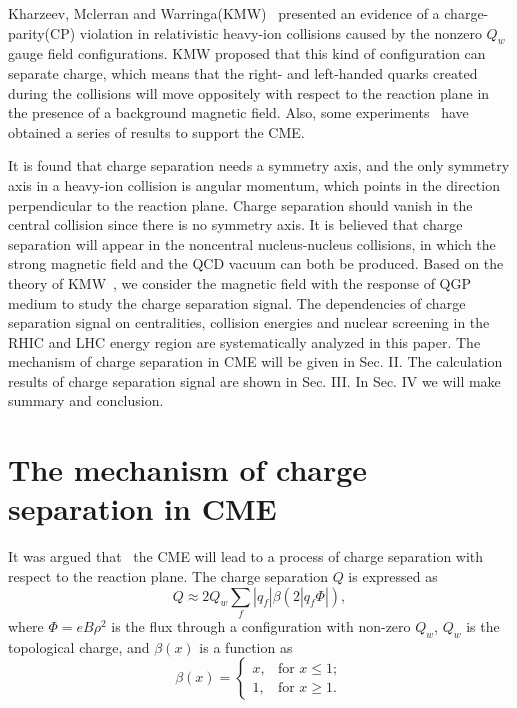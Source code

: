 \documentclass[twocolumn,showpacs,preprintnumbers,amsmath,amssymb]{revtex4}
\begin{document}
Kharzeev, Mclerran and Warringa(KMW)~\cite{lab7} presented an evidence of a charge-parity(CP) violation
in relativistic heavy-ion collisions caused by the nonzero $Q_{w}$ gauge field configurations. KMW proposed that this kind of configuration can separate charge, which means
that the right- and left-handed quarks created during the collisions will move oppositely with
respect to the reaction plane in the presence of a background magnetic field.
Also, some experiments~\cite{lab8, lab9,lab10,lab11} have obtained a series of results to support the CME.

It is found that charge separation needs a symmetry axis, and the only symmetry axis in a
heavy-ion collision is angular momentum, which points in the direction perpendicular to the reaction plane. 
Charge separation should vanish in the central collision since there is no symmetry axis. 
It is believed that charge separation will appear in the noncentral nucleus-nucleus collisions, in which the strong magnetic field and the QCD vacuum can both  be produced. 
Based on the theory of KMW~\cite{lab7}, we consider the magnetic field with the response of QGP medium to study the charge separation signal. 
The dependencies of charge separation signal on centralities, collision energies and nuclear screening in the RHIC and LHC energy region are systematically analyzed in this paper.
The mechanism of charge separation in CME will be given in Sec. II. The calculation results of charge separation signal are shown in Sec. III.
In Sec. IV we will make summary and conclusion.

\section{The mechanism of charge separation in CME}
It was argued that~\cite{lab7} the CME will lead to a process of charge separation with respect to the reaction
plane. The charge separation $Q$ is expressed as
\begin{equation}%
Q\approx2Q_{w}\sum_{f}|q_{f}|\beta(2|q_{f}\Phi|),
\label{eq:eq1} %
\end{equation}
where $\Phi=eB\rho^{2}$ is the flux through a configuration with non-zero $Q_{w}$, $Q_{w}$ is the topological charge,
and $\beta(x)$ is a function as
\begin{equation}
\beta(x)= \begin{cases}
x, & \text{for } x \leq 1;\\
1, & \text{for } x \geq 1.
\end{cases}
\label{eq:eq2} %
\end{equation}
\end{document}
